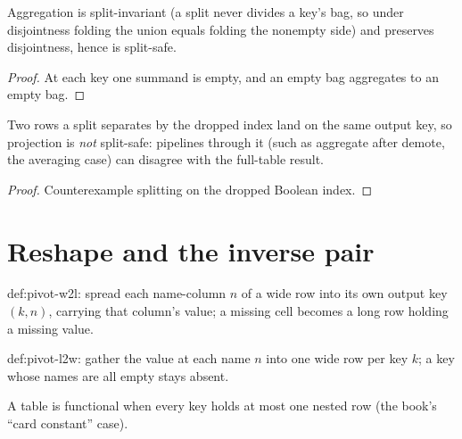 \begin{theorem}
  \label{thm:aggregate-splitsafe}\leanok
  Aggregation is split-invariant (a split never divides a key's bag, so
  under disjointness folding the union equals folding the nonempty
  side) and preserves disjointness, hence is split-safe.
\end{theorem}
\begin{proof}\leanok
  At each key one summand is empty, and an empty bag aggregates to an
  empty bag.
\end{proof}

\begin{theorem}
  \label{thm:demote-not-preservesdisjoint}
  \leanok
  Two rows a split separates by the dropped index land on the same
  output key, so projection is \emph{not} split-safe: pipelines through
  it (such as aggregate after demote, the averaging case) can disagree
  with the full-table result.
\end{theorem}
\begin{proof}\leanok
  Counterexample splitting on the dropped Boolean index.
\end{proof}

\chapter{Reshape and the inverse pair}

\begin{definition}
  \label{def:unpivot}\leanok
  def:pivot-w2l: spread each name-column $n$ of a wide row into its own
  output key $(k, n)$, carrying that column's value; a missing cell
  becomes a long row holding a missing value.
\end{definition}

\begin{definition}[Pivot]
  \label{def:pivot}\leanok
  def:pivot-l2w: gather the value at each name $n$ into one wide row per
  key $k$; a key whose names are all empty stays absent.
\end{definition}

\begin{definition}
  \label{def:functional}\leanok
  A table is functional when every key holds at most one nested row (the
  book's ``card constant'' case).
\end{definition}

